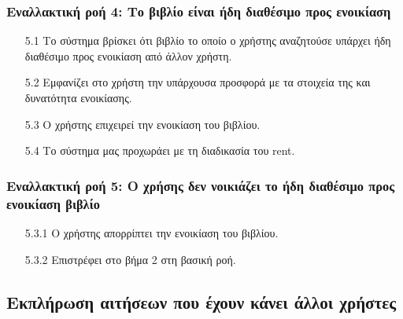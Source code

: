 \documentclass[12pt,a4paper]{article}
\begin{document}
\subsubsection*{Εναλλακτική ροή 4: Το βιβλίο είναι ήδη διαθέσιμο προς ενοικίαση}
\begin{enumerate}
    \item[5.1] Το σύστημα βρίσκει ότι βιβλίο το οποίο ο χρήστης αναζητούσε υπάρχει ήδη διαθέσιμο προς ενοικίαση από άλλον χρήστη.
    \item[5.2] Εμφανίζει στο χρήστη την υπάρχουσα προσφορά με τα στοιχεία της και δυνατότητα ενοικίασης.
    \item[5.3] Ο χρήστης επιχειρεί την ενοικίαση του βιβλίου.
    \item[5.4] Το σύστημα μας προχωράει με τη διαδικασία του rent.
\end{enumerate}

\subsubsection*{Εναλλακτική ροή 5: Ο χρήσης δεν νοικιάζει το ήδη διαθέσιμο προς ενοικίαση βιβλίο}
\begin{enumerate}
    \item [5.3.1] Ο χρήστης απορρίπτει την ενοικίαση του βιβλίου.
    \item [5.3.2] Επιστρέφει στο βήμα 2 στη βασική ροή.
\end{enumerate}

\subsection{Εκπλήρωση αιτήσεων που έχουν κάνει άλλοι χρήστες}
\end{document}
